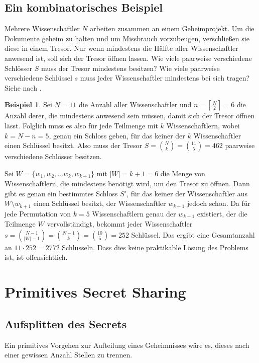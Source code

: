 \documentclass[12pt, a4paper, oneside, titlepage]{report}
\theoremstyle{definition}
\newtheorem{bsp}[lemma]{Beispiel}
\begin{document}
	\subsection{Ein kombinatorisches Beispiel}
	
	Mehrere Wissenschaftler $ N $ arbeiten zusammen an einem Geheimprojekt. Um die Dokumente geheim zu halten und um Missbrauch vorzubeugen, verschließen sie diese in einem Tresor. Nur wenn mindestens die Hälfte aller Wissenschaftler anwesend ist, soll sich der Tresor öffnen lassen. Wie viele paarweise verschiedene Schlösser $ S $ muss der Tresor mindestens besitzen? Wie viele paarweise verschiedene Schlüssel $ s $ muss jeder Wissenschaftler mindestens bei sich tragen? Siehe \cite{shamir} nach \cite{liu}.
	
	\begin{bsp}
		Sei $ N = 11 $ die Anzahl aller Wissenschaftler und $ n = \left\lceil\frac{N}{2} \right\rceil = 6 $ die Anzahl derer, die mindestens anwesend sein müssen, damit sich der Tresor öffnen lässt. Folglich muss es also für jede Teilmenge mit $ k $ Wissenschaftlern, wobei $ k = N - n = 5 $, genau ein Schloss geben, für das keiner der $ k $ Wissenschaftler einen Schlüssel besitzt. Also muss der Tresor $ S = \binom{N}{k} = \binom{11}{5} = 462 $ paarweise verschiedene Schlösser besitzen.
		
		Sei $ W = \{w_1, w_2, \dots w_k, w_{k+1}\} $ mit $ |W| = k + 1 = 6 $ die Menge von Wissenschaftlern, die mindestens benötigt wird, um den Tresor zu öffnen. Dann gibt es genau ein bestimmtes Schloss $ S' $, für das keiner der Wissenschaftler aus $ W \setminus w_{k+1} $ einen Schlüssel besitzt, der Wissenschaftler $ w_{k+1} $ jedoch schon. Da für jede Permutation von $ k = 5 $ Wissenschaftlern genau der $ w_{k+1} $ existiert, der die Teilmenge $ W $ \glqq vervollständigt\grqq, bekommt jeder Wissenschaftler $ s = \binom{N-1}{|W|-1} = \binom{N-1}{k} = \binom{10}{5} = 252 $ Schlüssel. Das ergibt eine Gesamtanzahl an $ 11 \cdot 252 = 2772 $ Schlüsseln. Dass dies keine praktikable Lösung des Problems ist, ist offensichtlich.
	\end{bsp}
	\section{Primitives Secret Sharing}
	\subsection{Aufsplitten des Secrets}
		Ein primitives Vorgehen zur Aufteilung eines Geheimnisses wäre es, dieses nach einer gewissen Anzahl Stellen zu trennen.
		
\end{document}
